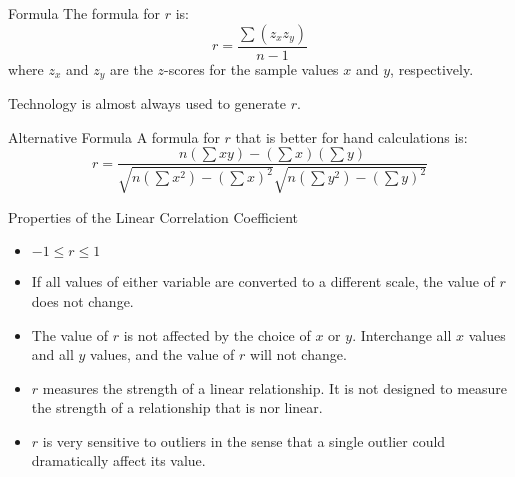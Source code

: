 \documentclass{beamer}
\begin{document}
\begin{frame}
\begin{block}{Formula}
The formula for $r$ is:
\begin{equation*}
r=\dfrac{\sum(z_x z_y)}{n-1}
\end{equation*}
where $z_x$ and $z_y$ are the $z$-scores for the sample values $x$ and $y$, respectively.
\end{block}\pause

\begin{note}
Technology is almost always used to generate $r$.
\end{note}\pause

\begin{block}{Alternative Formula}
A formula for $r$ that is better for hand calculations is:
\begin{equation*}
r=\dfrac{n(\sum xy)-(\sum x)(\sum y)}{\sqrt{n(\sum x^2)-{(\sum x)}^2}\sqrt{n(\sum y^2)-{(\sum y)}^2}}
\end{equation*}
\end{block}
\end{frame}

\begin{frame}
\begin{block}{Properties of the Linear Correlation Coefficient}
\begin{itemize}[<+- | alert@+>]
\item $-1\leq r \leq 1$
\item If all values of either variable are converted to a different scale, the value of $r$ does not change.
\item The value of $r$ is not affected by the choice of $x$ or $y$. Interchange all $x$ values and all $y$ values, and the value of $r$ will not change.
\item $r$ measures the strength of a linear relationship. It is not designed to measure the strength of a relationship that is nor linear.
\item $r$ is very sensitive to outliers in the sense that a single outlier could dramatically affect its value.
\end{itemize}
\end{block}
\end{frame}
\end{document}
